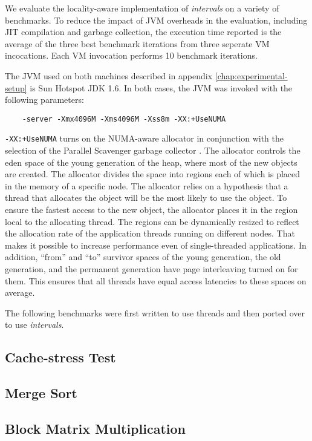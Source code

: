 We evaluate the locality-aware implementation of \emph{intervals} on a
variety of benchmarks. To reduce the impact of JVM overheads in the
evaluation, including JIT compilation and garbage collection, the
execution time reported is the average of the three best benchmark
iterations from three seperate VM incocations. Each VM invocation
performs 10 benchmark iterations.

The JVM used on both machines described in appendix
\ref{chap:experimental-setup} is Sun Hotspot JDK 1.6. In both cases,
the JVM was invoked with the following parameters:

\begin{verbatim}
    -server -Xmx4096M -Xms4096M -Xss8m -XX:+UseNUMA
\end{verbatim}

\verb!-XX:+UseNUMA! turns on the NUMA-aware allocator in conjunction
with the selection of the Parallel Scavenger garbage collector
\cite{Oracle2010, Humble2010}. The allocator controls the eden space
of the young generation of the heap, where most of the new objects are
created. The allocator divides the space into regions each of which is
placed in the memory of a specific node. The allocator relies on a
hypothesis that a thread that allocates the object will be the most
likely to use the object. To ensure the fastest access to the new
object, the allocator places it in the region local to the allocating
thread. The regions can be dynamically resized to reflect the
allocation rate of the application threads running on different
nodes. That makes it possible to increase performance even of
single-threaded applications. In addition, ``from'' and ``to''
survivor spaces of the young generation, the old generation, and the
permanent generation have page interleaving turned on for them. This
ensures that all threads have equal access latencies to these spaces
on average.

The following benchmarks were first written to use threads and then
ported over to use \emph{intervals}.

\subsection*{Cache-stress Test}


\subsection*{Merge Sort}


\subsection*{Block Matrix Multiplication}



